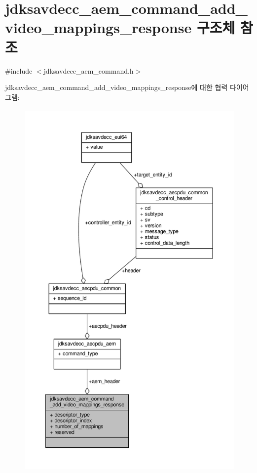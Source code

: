 \hypertarget{structjdksavdecc__aem__command__add__video__mappings__response}{}\section{jdksavdecc\+\_\+aem\+\_\+command\+\_\+add\+\_\+video\+\_\+mappings\+\_\+response 구조체 참조}
\label{structjdksavdecc__aem__command__add__video__mappings__response}


{\ttfamily \#include $<$jdksavdecc\+\_\+aem\+\_\+command.\+h$>$}



jdksavdecc\+\_\+aem\+\_\+command\+\_\+add\+\_\+video\+\_\+mappings\+\_\+response에 대한 협력 다이어그램\+:
\nopagebreak
\begin{figure}[H]
\begin{center}
\leavevmode
\includegraphics[height=550pt]{structjdksavdecc__aem__command__add__video__mappings__response__coll__graph}
\end{center}
\end{figure}
